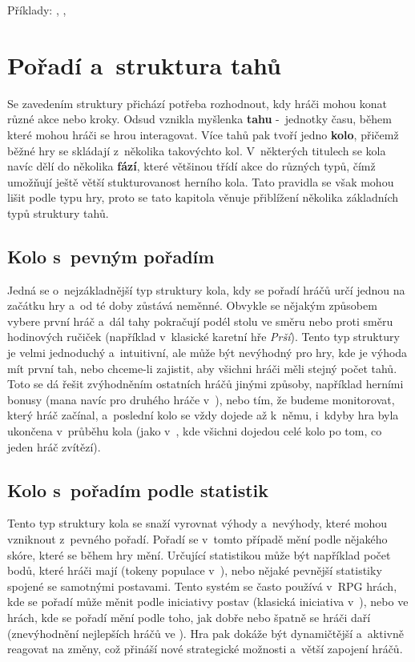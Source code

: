 Příklady: , , 



\section{Pořadí a~struktura tahů}
\label{sec:turns}

Se zavedením struktury přichází potřeba rozhodnout, kdy hráči mohou konat různé akce nebo kroky. Odsud vznikla myšlenka \textbf{tahu} -~jednotky času, během které mohou hráči se hrou interagovat. Více tahů pak tvoří jedno \textbf{kolo}, přičemž běžné hry se skládají z~několika takovýchto kol. V~některých titulech se kola navíc dělí do několika \textbf{fází}, které většinou třídí akce do různých typů, čímž umožňují ještě větší stukturovanost herního kola. Tato pravidla se však mohou lišit podle typu hry, proto se tato kapitola věnuje přiblížení několika základních typů struktury tahů.

\subsection{Kolo s~pevným pořadím}
\label{subsec:turns_fixed_order}

Jedná se o~nejzákladnější typ struktury kola, kdy se pořadí hráčů určí jednou na začátku hry a~od té doby zůstává neměnné. Obvykle se nějakým způsobem vybere první hráč a~dál tahy pokračují podél stolu ve směru nebo proti směru hodinových ručiček (například v~klasické karetní hře \textit{Prší}). Tento typ struktury je velmi jednoduchý a~intuitivní, ale může být nevýhodný pro hry, kde je výhoda mít první tah, nebo chceme-li zajistit, aby všichni hráči měli stejný počet tahů. Toto se dá řešit zvýhodněním ostatních hráčů jinými způsoby, například herními bonusy (mana navíc pro druhého hráče v~), nebo tím, že budeme monitorovat, který hráč začínal, a~poslední kolo se vždy dojede až k~němu, i~kdyby hra byla ukončena v~průběhu kola (jako v~, kde všichni dojedou celé kolo po tom, co jeden hráč zvítězí).

\subsection{Kolo s~pořadím podle statistik}
\label{subsec:turns_stat_order}

Tento typ struktury kola se snaží vyrovnat výhody a~nevýhody, které mohou vzniknout z~pevného pořadí. Pořadí se v~tomto případě mění podle nějakého skóre, které se během hry mění. Určující statistikou může být například počet bodů, které hráči mají (tokeny populace v~), nebo nějaké pevnější statistiky spojené se samotnými postavami. Tento systém se často používá v~RPG hrách, kde se pořadí může měnit podle iniciativy postav (klasická iniciativa v~), nebo ve hrách, kde se pořadí mění podle toho, jak dobře nebo špatně se hráči daří (znevýhodnění nejlepších hráčů ve ). Hra pak dokáže být dynamičtější a~aktivně reagovat na změny, což přináší nové strategické možnosti a~větší zapojení hráčů.

